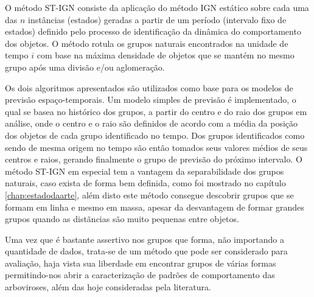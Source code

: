 O método \acrshort{ST-IGN} consiste da aplicação do método \acrshort{IGN} estático \cite{simposioNeg2003} sobre cada uma das $n$ instâncias (estados) geradas a partir de um período (intervalo fixo de estados) definido pelo processo de identificação da dinâmica do comportamento dos objetos. O método rotula os grupos naturais encontrados na unidade de tempo $i$ com base na máxima densidade de objetos que se mantém no mesmo grupo após uma divisão e/ou aglomeração.

Os dois algoritmos apresentados são utilizados como base para os modelos de previsão espaço-temporais. Um modelo simples de previsão é implementado, o qual se basea no histórico dos grupos, a partir do centro e do raio dos grupos em análise, onde o centro e o raio são definidos de acordo com a média da posição dos objetos de cada grupo identificado no tempo. Dos grupos identificados como sendo de mesma origem no tempo são então tomados seus valores médios de seus centros e raios, gerando finalmente o grupo de previsão do próximo intervalo. O método \acrshort{ST-IGN} em especial tem a vantagem da separabilidade dos grupos naturais, caso exista de forma bem definida, como foi mostrado no capítulo \ref{chap:estadodaarte}, além disto este método consegue descobrir grupos que se formam em linha e mesmo em massa, apesar da desvantagem de formar grandes grupos quando as distãncias são muito pequenas entre objetos.

Uma vez que é bastante assertivo nos grupos que forma, não importando a quantidade de dados, trata-se de um método que pode ser considerado para avaliação, haja vista sua liberdade em encontrar grupos de várias formas permitindo-nos abrir a caracterização de padrões de comportamento das arboviroses, além das hoje consideradas pela literatura.